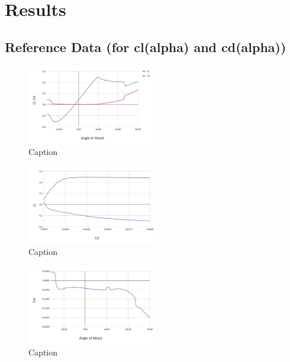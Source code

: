 \chapter{Results}

\section{Reference Data (for cl(alpha) and cd(alpha))}
\begin{figure}
    \centering
    \includegraphics[width=0.5\textwidth]{Figures/REF_CLCDALPHA.png}
    \caption{Caption}
    \label{fig:enter-label}
\end{figure}
\begin{figure}
    \centering
    \includegraphics[width=0.5\textwidth]{Figures/REF_CLCD.png}
    \caption{Caption}
    \label{fig:enter-label}
\end{figure}
\begin{figure}
    \centering
    \includegraphics[width=0.5\textwidth]{Figures/REF_CMALPHA.png}
    \caption{Caption}
    \label{fig:enter-label}
\end{figure}